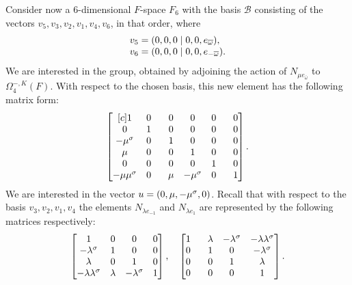 Consider now a $6$-dimensional $F$-space $F_6$ with the basis $\mathcal{B}$ consisting of the vectors
$v_5, v_3, v_2, v_1, v_4, v_6$, in that order, where
\begin{equation}
	\begin{array}{r@{\;}c@{\;}l}
		v_5 & = & (0,0,0\mid 0,0,e_{\bar{\omega}}), \\
		v_6 & = & (0,0,0\mid 0,0,e_{-\bar{\omega}}). \\
	\end{array} 
\end{equation}
We are interested in the group, obtained by adjoining the action of $N_{\mu e_{\bar{\omega}}}$ to 
$\Omega_4^{-,K}(F)$. With respect to the chosen basis, this new element has the following matrix form:
\begin{equation}
	\begin{bmatrix}[c]
		1 & 0 &  \phantom{-}0 & 0 & 0 & \phantom{-}0 \\
		0 & 1 & \phantom{-}0 & 0 & 0 & \phantom{-}0 \\
		-\mu^{\sigma} & 0 & \phantom{-}1 & 0 & 0 & \phantom{-}0 \\
		\mu & 0 & \phantom{-}0 & 1 & 0 & \phantom{-}0 \\
		0 & 0 & \phantom{-}0 & 0 & 1 & \phantom{-}0 \\
		-\mu \mu^{\sigma} & 0 & \phantom{-}\mu & -\mu^{\sigma} & 0 & \phantom{-}1
	\end{bmatrix}.
\end{equation}
We are interested in the vector $u = (0,\mu, -\mu^{\sigma}, 0)$. Recall that with respect to the basis
$v_3, v_2, v_1, v_4$ the elements $N_{\lambda e_{-1}}$ and $N_{\lambda e_1}$ are represented 
by the following matrices respectively:
\begin{equation}
		 \begin{bmatrix}
			1 & 0 & 0 & 0 \\
			-\lambda^{\sigma} & 1 & 0 & 0 \\
			\lambda & 0 & 1 & 0 \\
			-\lambda\lambda^{\sigma} & \lambda & -\lambda^{\sigma} & 1
		\end{bmatrix},\quad 
		\begin{bmatrix}
			1 & \phantom{-}\lambda & -\lambda^{\sigma} & -\lambda\lambda^{\sigma} \\
			0 & \phantom{-}1 & 0 & -\lambda^{\sigma} \\
			0 & \phantom{-}0 & 1 & \lambda \\
			0 & \phantom{-}0 & 0 & 1
		\end{bmatrix}.	
\end{equation}
